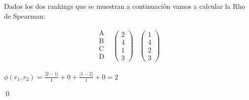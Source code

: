 \begin{ejem} Dados los dos rankings que se muestran a continuación vamos a calcular la Rho de Spearman:
\end{ejem}
\begin{center}
	\[
	\begin{array}{ccc}
	\begin{array}{c}
	\text{A}\\
	\text{B} \\
	\text{C} \\
	\text{D} \\
	\end{array} & \left(\begin{array}{c}
	2\\
	4\\
	1\\
	3
	\end{array} \right)& \left(\begin{array}{c}
	1\\
	4\\
	2\\
	3
	\end{array} \right)
	\end{array}  
	\]
	
	$ \phi (r_{1},r_{2}) = \frac{|2-1|}{1} + 0 + \frac{|1-2|}{1} + 0 = 2$
	
\end{center}

\qed